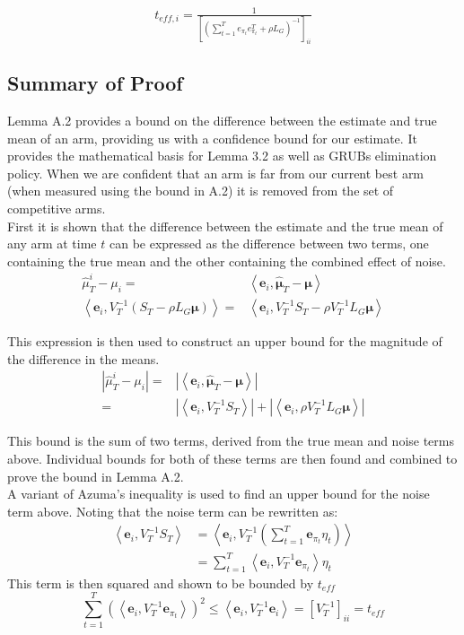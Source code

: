 \documentclass{article}[12pt]
\newcommand{\abs}[1]{\left\lvert #1 \right\rvert}
\newcommand{\ip}[2]{\left\langle #1,#2 \right\rangle}
\begin{document}
\begin{equation}
t_{eff,i} = \tfrac{1}{\left[ \left( \sum_{t=1}^T e_{\pi_t} e_{\pi_t}^T + \rho L_G \right)^{-1} \right]_{ii}}
\end{equation}

\subsection{Summary of Proof}

Lemma A.2 provides a bound on the difference between the estimate and true mean of an arm, providing us with a confidence bound for our estimate.
It provides the mathematical basis for Lemma 3.2 as well as GRUBs elimination policy.
When we are confident that an arm is far from our current best arm (when measured using the bound in A.2) it is removed from the set of competitive arms.	\\

First it is shown that the difference between the estimate and the true mean of any arm at time $t$ can be expressed as the difference between two terms,
one containing the true mean and the other containing the combined effect of noise. 
\begin{eqnarray}
  \hat{\mu}^i_T - \mu_i = & \ip{\bm{e}_i}{\hat{\bm{\mu}}_T - \bm{\mu}} \\
  \ip{\bm{e}_i}{V^{-1}_T \left(S_T - \rho L_G \bm{\mu}\right)}
  = & \ip{\bm{e}_i}{V^{-1}_T S_T - \rho V^{-1}_T L_G \bm{\mu}}
\end{eqnarray}

This expression is then used to construct an upper bound for the magnitude of the difference in the means.
\begin{eqnarray}
  \abs{\hat{\mu}^i_T - \mu_i} = & \abs{\ip{\bm{e}_i}{\hat{\bm{\mu}}_T - \bm{\mu}}} \\
  = & \abs{\ip{\bm{e}_i}{V^{-1}_T S_T}} + \abs{\ip{\bm{e}_i}{\rho V^{-1}_T L_G \bm{\mu}}}
\end{eqnarray}

This bound is the sum of two terms, derived from the true mean and noise terms above.
Individual bounds for both of these terms are then found and combined to prove the bound in Lemma A.2. \\


A variant of Azuma’s inequality is used to find an upper bound for the noise term above.
Noting that the noise term can be rewritten as:
\begin{eqnarray}
  \ip{\bm{e}_i}{V^{-1}_T S_T} & = \ip{\bm{e}_i}{V^{-1}_T \left(\sum_{t=1}^{T} \bm{e}_{\pi_t}\eta_t \right)}  \\
  & = \sum_{t=1}^T \ip{\bm{e}_i}{V^{-1}_T \bm{e}_{\pi_t}} \eta_t
\end{eqnarray}
This term is then squared and shown to be bounded by $t_{eff}$
\begin{equation}
  \sum_{t=1}^T \left( \ip{\bm{e}_i}{V^{-1}_T \bm{e}_{\pi_t}} \right)^2
  \leq \ip{\bm{e}_i}{V^{-1}_T \bm{e}_i} = \left[ V^{-1}_T \right]_{ii} = t_{eff}
\end{equation}
\end{document}
